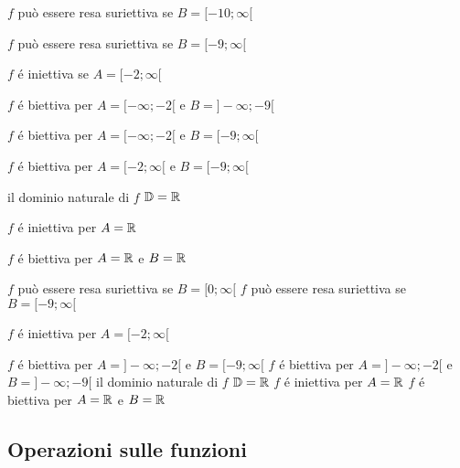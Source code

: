 \begin{questions}
\question
{}

\begin{checkboxes}

\choice $f$ può essere resa suriettiva se $B=[-10;\infty[$

\CorrectChoice $f$ può essere resa suriettiva se $B=[-9;\infty[$

\CorrectChoice $f$ é iniettiva se $A=[-2;\infty[$

\choice $f$ é biettiva per $A=[-\infty;-2[$ e $B=]-\infty;-9[$

\CorrectChoice $f$ é biettiva per $A=[-\infty;-2[$ e $B=[-9;\infty[$

\CorrectChoice $f$ é biettiva per $A=[-2;\infty[$ e $B=[-9;\infty[$

\CorrectChoice il dominio naturale di $f$ $\mathbb{D}=\mathbb{R}$

\choice $f$ é iniettiva per $A=\mathbb{R}$

\choice $f$ é biettiva per $A=\mathbb{R}$ e $B=\mathbb{R}$

\end{checkboxes}

\question
{}

\begin{checkboxes}

\CorrectChoice $f$  può essere resa suriettiva se  $B=[0;\infty[$
\CorrectChoice $f$  può essere resa suriettiva se  $B=[-9;\infty[$

\CorrectChoice $f$ é iniettiva per $A=[-2;\infty[$

\choice $f$ é biettiva per $A=]-\infty;-2[$ e $B=[-9;\infty[$
\CorrectChoice $f$ é biettiva per $A=]-\infty;-2[$ e $B=]-\infty;-9[$
\CorrectChoice il dominio naturale di $f$ $\mathbb{D}=\mathbb{R}$
\CorrectChoice $f$ é iniettiva per $A=\mathbb{R}$
\CorrectChoice $f$ é biettiva per $A=\mathbb{R}$ e $B=\mathbb{R}$

\end{checkboxes}
\end{questions}

\subsection{Operazioni sulle funzioni}

